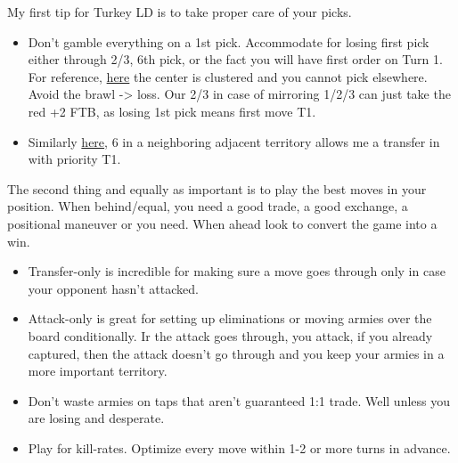 My first tip for Turkey LD is to take proper care of your picks.

\begin{itemize}
    \item Don't gamble everything on a 1st pick. Accommodate for losing first pick either through 2/3, 6th pick, or the fact you will have first order on Turn 1. For reference, \href{https://www.warzone.com/MultiPlayer?GameID=40836522}{here} the center is clustered and you cannot pick elsewhere. Avoid the brawl -> loss. Our 2/3 in case of mirroring 1/2/3 can just take the red +2 FTB, as losing 1st pick means first move T1. 
    \item Similarly \href{https://www.warzone.com/MultiPlayer?GameID=41524702}{here}, 6 in a neighboring adjacent territory allows me a transfer in with priority T1.
\end{itemize}

The second thing and equally as important is to play the best moves in your position. When behind/equal, you need a good trade, a good exchange, a positional maneuver or you need. When ahead look to convert the game into a win. 

\begin{itemize}
    \item Transfer-only is incredible for making sure a move goes through only in case your opponent hasn't attacked.
    \item Attack-only is great for setting up eliminations or moving armies over the board conditionally. Ir the attack goes through, you attack, if you already captured, then the attack doesn't go through and you keep your armies in a more important territory.
    \item Don't waste armies on taps that aren't guaranteed 1:1 trade. Well unless you are losing and desperate.
    \item Play for kill-rates. Optimize every move within 1-2 or more turns in advance. 
\end{itemize} 


